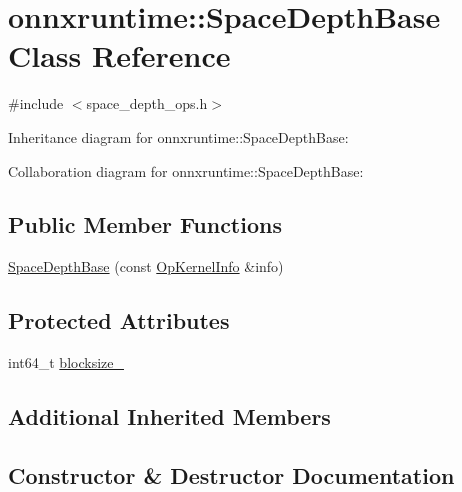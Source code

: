 \hypertarget{classonnxruntime_1_1SpaceDepthBase}{}\section{onnxruntime\+:\+:Space\+Depth\+Base Class Reference}
\label{classonnxruntime_1_1SpaceDepthBase}


{\ttfamily \#include $<$space\+\_\+depth\+\_\+ops.\+h$>$}



Inheritance diagram for onnxruntime\+:\+:Space\+Depth\+Base\+:


Collaboration diagram for onnxruntime\+:\+:Space\+Depth\+Base\+:
\subsection*{Public Member Functions}
\begin{DoxyCompactItemize}
\item 
\mbox{\hyperlink{classonnxruntime_1_1SpaceDepthBase_a0fd198b7e1df9c34e1ccb2304bcc0c54}{Space\+Depth\+Base}} (const \mbox{\hyperlink{classonnxruntime_1_1OpKernelInfo}{Op\+Kernel\+Info}} \&info)
\end{DoxyCompactItemize}
\subsection*{Protected Attributes}
\begin{DoxyCompactItemize}
\item 
int64\+\_\+t \mbox{\hyperlink{classonnxruntime_1_1SpaceDepthBase_abcda784e40ba19733f34160b9c6b185a}{blocksize\+\_\+}}
\end{DoxyCompactItemize}
\subsection*{Additional Inherited Members}


\subsection{Constructor \& Destructor Documentation}
\mbox{\label{classonnxruntime_1_1SpaceDepthBase_a0fd198b7e1df9c34e1ccb2304bcc0c54}} 
